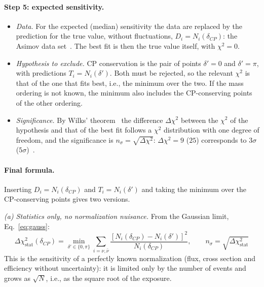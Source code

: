 \documentclass[11pt,a4paper]{article}
\begin{document}
\paragraph{Step 5: expected sensitivity.}
\begin{itemize}
  \item \emph{Data.} For the expected (median) sensitivity the data are replaced by the prediction for the true
        value, without fluctuations, $D_i = N_i(\delta_{CP})$: the Asimov data set~\cite{Cowan:2010js}. The best
        fit is then the true value itself, with $\chi^2 = 0$.
  \item \emph{Hypothesis to exclude.} CP conservation is the pair of points $\delta'=0$ and $\delta'=\pi$, with
        predictions $T_i = N_i(\delta')$. Both must be rejected, so the relevant $\chi^2$ is that of the one that
        fits best, i.e., the minimum over the two. If the mass ordering is not known, the minimum also includes the
        CP-conserving points of the other ordering.
  \item \emph{Significance.} By Wilks' theorem~\cite{Wilks:1938dza} the difference $\Delta\chi^2$ between the
        $\chi^2$ of the hypothesis and that of the best fit follows a $\chi^2$ distribution with one degree of
        freedom, and the significance is $n_\sigma = \sqrt{\Delta\chi^2}$: $\Delta\chi^2 = 9$ ($25$) corresponds to
        $3\sigma$ ($5\sigma$)~\cite{ParticleDataGroup:2024cfk}.
\end{itemize}

\paragraph{Final formula.}
Inserting $D_i = N_i(\delta_{CP})$ and $T_i = N_i(\delta')$ and taking the minimum over the CP-conserving points
gives two versions.

\emph{(a) Statistics only, no normalization nuisance.} From the Gaussian limit, Eq.~\eqref{eq:gauss}:
\begin{equation}
  \boxed{\;\Delta\chi^2_\text{stat}(\delta_{CP}) = \min_{\delta'\in\{0,\pi\}} \sum_{i=\nu,\bar\nu}
  \frac{\left[N_i(\delta_{CP}) - N_i(\delta')\right]^2}{N_i(\delta_{CP})},
  \qquad n_\sigma = \sqrt{\Delta\chi^2_\text{stat}}\;}
  \label{eq:chi2stat}
\end{equation}
This is the sensitivity of a perfectly known normalization (flux, cross section and efficiency without
uncertainty): it is limited only by the number of events and grows as $\sqrt{N}$, i.e., as the square root of the
exposure.
\end{document}
